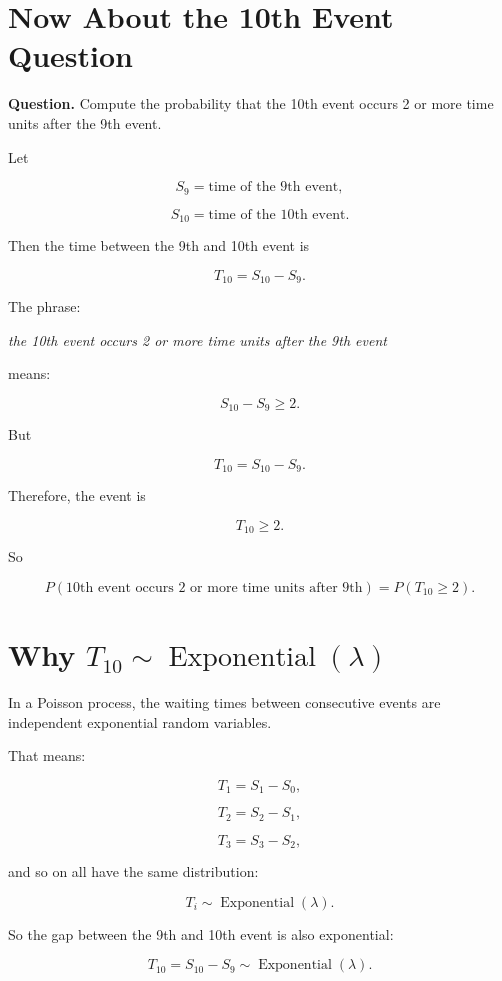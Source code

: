 \documentclass[12pt]{article}
\begin{document}
\section{Now About the 10th Event Question}

\textbf{Question.}
Compute the probability that the 10th event occurs 2 or more time units after the 9th event.

Let

\[
S_9=\text{time of the 9th event},
\]

\[
S_{10}=\text{time of the 10th event}.
\]

Then the time between the 9th and 10th event is

\[
T_{10}=S_{10}-S_9.
\]

The phrase:

\begin{center}
\textit{the 10th event occurs 2 or more time units after the 9th event}
\end{center}

means:

\[
S_{10}-S_9\geq 2.
\]

But

\[
T_{10}=S_{10}-S_9.
\]

Therefore, the event is

\[
T_{10}\geq 2.
\]

So

\[
\boxed{
P(\text{10th event occurs 2 or more time units after 9th})
=P(T_{10}\geq 2).
}
\]

\section{Why \(T_{10}\sim \operatorname{Exponential}(\lambda)\)}

In a Poisson process, the waiting times between consecutive events are independent exponential random variables.

That means:

\[
T_1=S_1-S_0,
\]

\[
T_2=S_2-S_1,
\]

\[
T_3=S_3-S_2,
\]

and so on all have the same distribution:

\[
T_i\sim \operatorname{Exponential}(\lambda).
\]

So the gap between the 9th and 10th event is also exponential:

\[
T_{10}=S_{10}-S_9\sim \operatorname{Exponential}(\lambda).
\]
\end{document}
